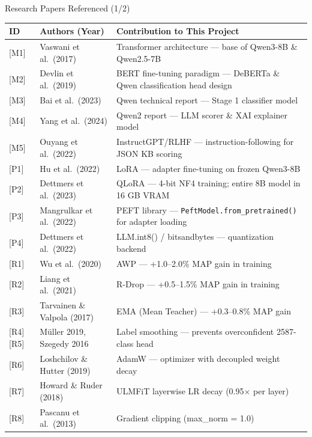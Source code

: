 ﻿\documentclass[aspectratio=169,10pt]{beamer}
\begin{document}
\begin{frame}[shrink=3]{Research Papers Referenced (1/2)}
\scriptsize
\setlength{\tabcolsep}{3pt}
\renewcommand{\arraystretch}{1.2}
\begin{tabular}{p{0.6cm}p{3.2cm}p{7.0cm}}
\toprule
\textbf{ID} & \textbf{Authors (Year)} & \textbf{Contribution to This Project}\\
\midrule
\rowcolor{RowTintA}
{[M1]} & Vaswani et al.\ (2017) & Transformer architecture --- base of Qwen3-8B \& Qwen2.5-7B\\
{[M2]} & Devlin et al.\ (2019) & BERT fine-tuning paradigm --- DeBERTa \& Qwen classification head design\\
\rowcolor{RowTintA}
{[M3]} & Bai et al.\ (2023) & Qwen technical report --- Stage 1 classifier model\\
{[M4]} & Yang et al.\ (2024) & Qwen2 report --- LLM scorer \& XAI explainer model\\
\rowcolor{RowTintA}
{[M5]} & Ouyang et al.\ (2022) & InstructGPT/RLHF --- instruction-following for JSON KB scoring\\
{[P1]} & Hu et al.\ (2022) & LoRA --- adapter fine-tuning on frozen Qwen3-8B\\
\rowcolor{RowTintA}
{[P2]} & Dettmers et al.\ (2023) & QLoRA --- 4-bit NF4 training; entire 8B model in 16 GB VRAM\\
{[P3]} & Mangrulkar et al.\ (2022) & PEFT library --- \texttt{PeftModel.from\_pretrained()} for adapter loading\\
\rowcolor{RowTintA}
{[P4]} & Dettmers et al.\ (2022) & LLM.int8() / bitsandbytes --- quantization backend\\
{[R1]} & Wu et al.\ (2020) & AWP --- +1.0--2.0\% MAP gain in training\\
\rowcolor{RowTintA}
{[R2]} & Liang et al.\ (2021) & R-Drop --- +0.5--1.5\% MAP gain in training\\
{[R3]} & Tarvainen \& Valpola (2017) & EMA (Mean Teacher) --- +0.3--0.8\% MAP gain\\
\rowcolor{RowTintA}
{[R4][R5]} & M\"uller 2019, Szegedy 2016 & Label smoothing --- prevents overconfident 2587-class head\\
{[R6]} & Loshchilov \& Hutter (2019) & AdamW --- optimizer with decoupled weight decay\\
\rowcolor{RowTintA}
{[R7]} & Howard \& Ruder (2018) & ULMFiT layerwise LR decay (0.95$\times$ per layer)\\
{[R8]} & Pascanu et al.\ (2013) & Gradient clipping (max\_norm = 1.0)\\
\bottomrule
\end{tabular}
\end{frame}
\end{document}
